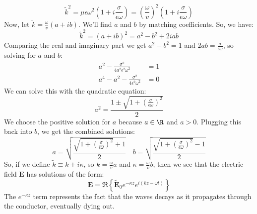 \[
	\tilde k^2 = \mu \epsilon \omega^2\left( 1 + i \frac{\sigma}{\epsilon \omega} \right) = \left(
	\frac{\omega}{v} \right)^2 \left( 1 + i \frac{\sigma}{\epsilon \omega} \right)
\]
Now, let \( \tilde k = \frac{\omega}{v}(a + ib) \). We'll find \( a \) and \( b \) by matching coefficients.
So, we have:
\[
	\tilde k^2 = (a + ib)^2 = a^2 - b^2 + 2iab 
\]
Comparing the real and imaginary part we get \( a^2 - b^2 = 1 \) and \( 2ab = \frac{\sigma}{\epsilon \omega}
\), so solving for \( a \) and \( b \):
\begin{align*}
	a^2 - \frac{\sigma^2}{4 a^2 \epsilon^2 \omega^2} &=  1 \\ 
	a^{4} - a^2 - \frac{\sigma^2}{4 \epsilon^2 \omega^2} &=  0
\end{align*}
We can solve this with the quadratic equation:
\[
	a^2 = \frac{1 \pm \sqrt{1 + \left( \frac{\sigma}{\epsilon \omega} \right)^2}}{2}
\]
We choose the positive solution for \( a \) because \( a \in \R	\) and \( a > 0 \). Plugging this back into
\( b \), we get the combined solutions:
\[
	a = \sqrt{\frac{\sqrt{1 + \left( \frac{\sigma}{\epsilon \omega} \right)^2} + 1}{2}} \quad b =
	\sqrt{\frac{\sqrt{1 + \left( \frac{\sigma}{\epsilon \omega} \right)^2} - 1}{2}}
\]
So, if we define \( \tilde k \equiv k + i \kappa \), so \( k = \frac{\omega}{v}a \) and \( \kappa =
\frac{\omega}{v} b \), then we see that the electric field \( \mathbf{E}  \) has solutions of the form:
\[
	\mathbf{E} = \Re\left\{ \tilde{\mathbf{E}}_0 e^{-\kappa z} e^{i(kz - \omega t)} \right\}
\]
The \( e^{-\kappa z} \) term represents the fact that the waves decays as it propagates through the
conductor, eventually dying out.      

